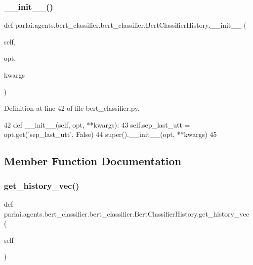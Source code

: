 \subsubsection{\texorpdfstring{\+\_\+\+\_\+init\+\_\+\+\_\+()}{\_\_init\_\_()}}
{\footnotesize\ttfamily def parlai.\+agents.\+bert\+\_\+classifier.\+bert\+\_\+classifier.\+Bert\+Classifier\+History.\+\_\+\+\_\+init\+\_\+\+\_\+ (\begin{DoxyParamCaption}\item[{}]{self,  }\item[{}]{opt,  }\item[{}]{kwargs }\end{DoxyParamCaption})}



Definition at line 42 of file bert\+\_\+classifier.\+py.


\begin{DoxyCode}
42     \textcolor{keyword}{def }\_\_init\_\_(self, opt, **kwargs):
43         self.sep\_last\_utt = opt.get(\textcolor{stringliteral}{'sep\_last\_utt'}, \textcolor{keyword}{False})
44         super().\_\_init\_\_(opt, **kwargs)
45 
\end{DoxyCode}


\subsection{Member Function Documentation}
\mbox{\label{classparlai_1_1agents_1_1bert__classifier_1_1bert__classifier_1_1BertClassifierHistory_ac5a9d856cbb3e3994e6c99dbb1578b13}} 
\subsubsection{\texorpdfstring{get\+\_\+history\+\_\+vec()}{get\_history\_vec()}}
{\footnotesize\ttfamily def parlai.\+agents.\+bert\+\_\+classifier.\+bert\+\_\+classifier.\+Bert\+Classifier\+History.\+get\+\_\+history\+\_\+vec (\begin{DoxyParamCaption}\item[{}]{self }\end{DoxyParamCaption})}

